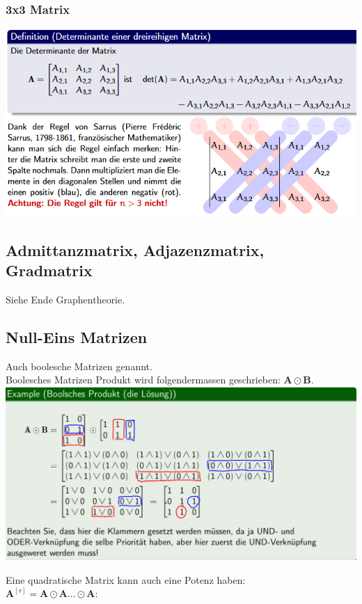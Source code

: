 \documentclass[12pt]{scrartcl}
\begin{document}
\subsubsection{3x3 Matrix}
\includegraphics[width=14cm]{img/determinante_2.png}


\subsection{Admittanzmatrix, Adjazenzmatrix, Gradmatrix}

Siehe Ende Graphentheorie.

\newpage
\subsection{Null-Eins Matrizen}
Auch boolesche Matrizen genannt.\\

Boolesches Matrizen Produkt wird folgendermassen geschrieben: $\mathbf{A} \odot  \mathbf{B}$.\\

\includegraphics[width=15cm]{img/boolesches_produkt.png}

Eine quadratische Matrix kann auch eine Potenz haben:\\
$\mathbf{A}^{[r]} = \mathbf{A} \odot \mathbf{A} \dots \odot \mathbf{A}$:\\
\end{document}
